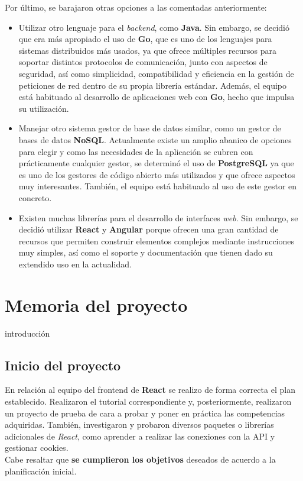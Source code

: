 \documentclass[11pt, a4paper, titlepage]{article}
\begin{document}
Por último, se barajaron otras opciones a las comentadas anteriormente:

\begin{itemize}
    \item Utilizar otro lenguaje para el \textit{backend}, como \textbf{Java}. Sin embargo, se decidió que era más apropiado el uso de \textbf{Go}, que es uno de los lenguajes para sistemas distribuidos más usados, ya que ofrece múltiples recursos para soportar distintos protocolos de comunicación, junto con aspectos de seguridad, así como simplicidad, compatibilidad y eficiencia en la gestión de peticiones de red dentro de su propia librería estándar. Además, el equipo está habituado al desarrollo de aplicaciones web con \textbf{Go}, hecho que impulsa su utilización.
    
    \item  Manejar otro sistema gestor de base de datos similar, como un gestor de bases de datos \textbf{NoSQL}. Actualmente existe un amplio abanico de opciones para elegir y como las necesidades de la aplicación se cubren con prácticamente cualquier gestor, se determinó el uso de  \textbf{PostgreSQL} ya que es uno de los gestores de código abierto más utilizados y que ofrece aspectos muy interesantes. También, el equipo está habituado al uso de este gestor en concreto.
    
    \item Existen muchas librerías para el desarrollo de interfaces \textit{web}. Sin embargo, se decidió utilizar  \textbf{React} y \textbf{Angular} porque ofrecen una gran cantidad de recursos que permiten construir elementos complejos mediante instrucciones muy simples, así como el soporte y documentación que tienen dado su extendido uso en la actualidad.
\end{itemize}


\section{Memoria del proyecto}
introducción

\subsection{Inicio del proyecto}
En relación al equipo del frontend de \textbf{React} se realizo de forma correcta el plan establecido. Realizaron el tutorial correspondiente y, posteriormente, realizaron un proyecto de prueba de cara a probar y poner en práctica las competencias adquiridas. También, investigaron y probaron diversos paquetes o librerías adicionales de \textit{React}, como aprender a realizar las conexiones con la API y gestionar cookies. \\
Cabe resaltar que \textbf{se cumplieron los objetivos} deseados de acuerdo a la planificación inicial. \\
\end{document}
